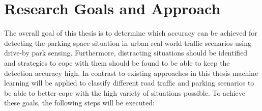 





\section{Research Goals and Approach}

The overall goal of this thesis is to determine which accuracy can be achieved for detecting the parking space situation in urban real world traffic scenarios using drive-by park sensing. Furthermore, distracting situations should be identified and strategies to cope with them should be found to be able to keep the detection accuracy high. In contrast to existing approaches in this thesis machine learning will be applied to classify different road traffic and parking scenarios to be able to better cope with the high variety of situations possible. To achieve these goals, the following steps will be executed:

